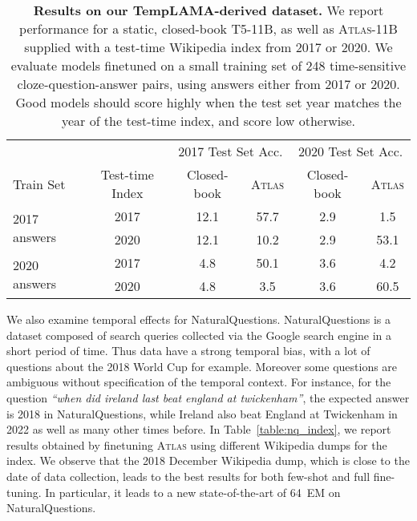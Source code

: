 \documentclass[10pt]{article} \usepackage[preprint]{tmlr}
\newcommand{\Atlas}{\textsc{Atlas}}
\begin{document}
\begin{table}[t]
  \begin{center}
   \caption{\textbf{Results on our TempLAMA-derived dataset.} We report performance for a static, closed-book T5-11B, as well as \Atlas{}-11B supplied with a test-time Wikipedia index from 2017 or 2020. We evaluate models finetuned on a small training set of 248 time-sensitive cloze-question-answer pairs, using answers either from 2017 or 2020.
  Good models should score highly when the test set year matches the year of the test-time index, and score low otherwise.}
      \vspace{0.5em}

  \begin{tabular}{l c cc cc}
    \toprule
     && \multicolumn{2}{c}{2017 Test Set Acc.} & \multicolumn{2}{c}{2020 Test Set Acc.} \\
    \cmidrule(lr){3-4} \cmidrule(lr){5-6} 
    Train Set & Test-time Index & Closed-book & \Atlas &Closed-book & \Atlas  \\
    \midrule
\multirow{2}{*}{2017 answers} & 2017 & 12.1 & 57.7 & 2.9 & 1.5\\
& 2020 & 12.1 & 10.2 & 2.9 & 53.1 \\
    \midrule
\multirow{2}{*}{2020 answers} & 2017 & 4.8

& 50.1 & 3.6& 4.2\\
& 2020 & 4.8
& 3.5 & 3.6 & 60.5\\
    \bottomrule
  \end{tabular}
   
  \label{table:templama}
  \end{center}
\end{table}

We also examine temporal effects for NaturalQuestions. 
NaturalQuestions is a dataset composed of search queries collected via the Google search engine in a short period of time.
Thus data have a strong temporal bias, with a lot of questions about the 2018 World Cup for example.
Moreover some questions are ambiguous without specification of the temporal context.
For instance, for the question \textit{``when did ireland last beat england at twickenham''}, the expected answer is 2018 in NaturalQuestions, while Ireland also beat England at Twickenham in 2022 as well as many other times before.
In Table~\ref{table:nq_index}, we report results obtained by finetuning \Atlas{} using different Wikipedia dumps for the index.
We observe that the 2018 December Wikipedia dump, which is close to the date of data collection, leads to the best results for both few-shot and full fine-tuning.
In particular, it leads to a new state-of-the-art of 64~EM on NaturalQuestions.
\end{document}
